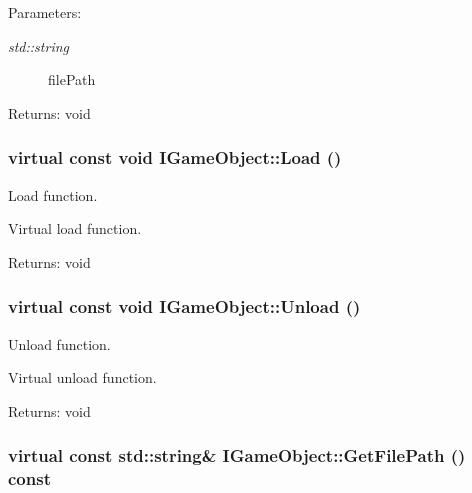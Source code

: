 \begin{Desc}
\item[Parameters:]
\begin{description}
\item[{\em std::string}]filePath \end{description}
\end{Desc}
\begin{Desc}
\item[Returns:]void \end{Desc}
\hypertarget{class_i_game_object_f60d2de5851de018cd9d0bc2fcb47427}{
\subsubsection[Load]{\setlength{\rightskip}{0pt plus 5cm}virtual const void IGameObject::Load ()}}
\label{class_i_game_object_f60d2de5851de018cd9d0bc2fcb47427}


Load function. 

Virtual load function.

\begin{Desc}
\item[Returns:]void \end{Desc}
\hypertarget{class_i_game_object_4570fd0ad8d774b5414874fc3a67640e}{
\subsubsection[Unload]{\setlength{\rightskip}{0pt plus 5cm}virtual const void IGameObject::Unload ()}}
\label{class_i_game_object_4570fd0ad8d774b5414874fc3a67640e}


Unload function. 

Virtual unload function.

\begin{Desc}
\item[Returns:]void \end{Desc}
\hypertarget{class_i_game_object_bd2bd922cf7546ae9dccb259dae58c99}{
\subsubsection[GetFilePath]{\setlength{\rightskip}{0pt plus 5cm}virtual const std::string\& IGameObject::GetFilePath () const}}
\label{class_i_game_object_bd2bd922cf7546ae9dccb259dae58c99}


